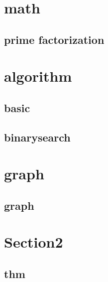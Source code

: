 \section{math}
        \subsection{prime factorization}
            

\section{algorithm}
        \subsection{basic}
            
        \subsection{binarysearch}
            


\section{graph}
        \subsection{graph}
            
  

\section{Section2}
    \subsection{thm}
        